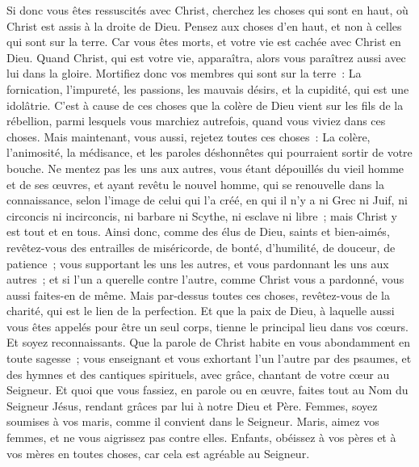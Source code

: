 \begin{multicols}{2}
\VerseOne{}Si donc vous êtes ressuscités avec Christ, cherchez les choses qui sont en haut, où Christ est assis à la droite de Dieu.
Pensez aux choses d'en haut, et non à celles qui sont sur la terre.
Car vous êtes morts, et votre vie est cachée avec Christ en Dieu.
Quand Christ, qui est votre vie, apparaîtra, alors vous paraîtrez aussi avec lui dans la gloire.
Mortifiez donc vos membres qui sont sur la terre~: La fornication, l'impureté, les passions, les mauvais désirs, et la cupidité, qui est une idolâtrie.
C'est à cause de ces choses que la colère de Dieu vient sur les fils de la rébellion,
parmi lesquels vous marchiez autrefois, quand vous viviez dans ces choses.
Mais maintenant, vous aussi, rejetez toutes ces choses~: La colère, l'animosité, la médisance, et les paroles déshonnêtes qui pourraient sortir de votre bouche.
Ne mentez pas les uns aux autres, vous étant dépouillés du vieil homme et de ses œuvres,
et ayant revêtu le nouvel homme, qui se renouvelle dans la connaissance, selon l'image de celui qui l'a créé,
en qui il n'y a ni Grec ni Juif, ni circoncis ni incirconcis, ni barbare ni Scythe, ni esclave ni libre~; mais Christ y est tout et en tous.
Ainsi donc, comme des élus de Dieu, saints et bien-aimés, revêtez-vous des entrailles de miséricorde, de bonté, d'humilité, de douceur, de patience~;
vous supportant les uns les autres, et vous pardonnant les uns aux autres~; et si l'un a querelle contre l'autre, comme Christ vous a pardonné, vous aussi faites-en de même.
Mais par-dessus toutes ces choses, revêtez-vous de la charité, qui est le lien de la perfection.
Et que la paix de Dieu, à laquelle aussi vous êtes appelés pour être un seul corps, tienne le principal lieu dans vos cœurs. Et soyez reconnaissants.
Que la parole de Christ habite en vous abondamment en toute sagesse~; vous enseignant et vous exhortant l'un l'autre par des psaumes, et des hymnes et des cantiques spirituels, avec grâce, chantant de votre cœur au Seigneur.
Et quoi que vous fassiez, en parole ou en œuvre, faites tout au Nom du Seigneur Jésus, rendant grâces par lui à notre Dieu et Père.
Femmes, soyez soumises à vos maris, comme il convient dans le Seigneur.
Maris, aimez vos femmes, et ne vous aigrissez pas contre elles.
Enfants, obéissez à vos pères et à vos mères en toutes choses, car cela est agréable au Seigneur.

\end{multicols}

